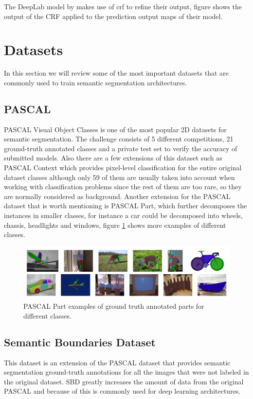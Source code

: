 The DeepLab model by \cite{DBLP:journals/corr/ChenPK0Y16} makes use of \gls{crf} to refine their output, figure  shows the output of the CRF applied to the prediction output maps of their model. 

\section{Datasets}
\label{sec:datasets}
In this section we will review some of the most important datasets that are commonly used to train semantic segmentation architectures. 

\subsection{PASCAL}
PASCAL Visual Object Classes is one of the most popular 2D datasets for semantic segmentation. The challenge consists of 5 different competitions, 21 ground-truth annotated classes and a private test set to verify the accuracy of submitted models. Also there are a few extensions of this dataset such as PASCAL Context which provides pixel-level classification for the entire original dataset classes although only 59 of them are usually taken into account when working with classification problems since the rest of them are too rare, so they are normally considered as background. Another extension for the PASCAL dataset that is worth mentioning is PASCAL Part, which further decomposes the instances in smaller classes, for instance a car could be decomposed into wheels, chassis, headlights and windows, figure \ref{fig:pascal_part} shows more examples of different classes.

\begin{figure}[h]
	\includegraphics[scale=0.35]{archivos/pascal_part.png}
	\centering
	\caption{PASCAL Part examples of ground truth annotated parts for different classes.}
	\label{fig:pascal_part}
\end{figure}

\subsection{Semantic Boundaries Dataset}
This dataset is an extension of the PASCAL dataset that provides semantic segmentation ground-truth annotations for all the images that were not labeled in the original dataset. SBD greatly increases the amount of data from the original PASCAL and because of this is commonly used for deep learning architectures.

